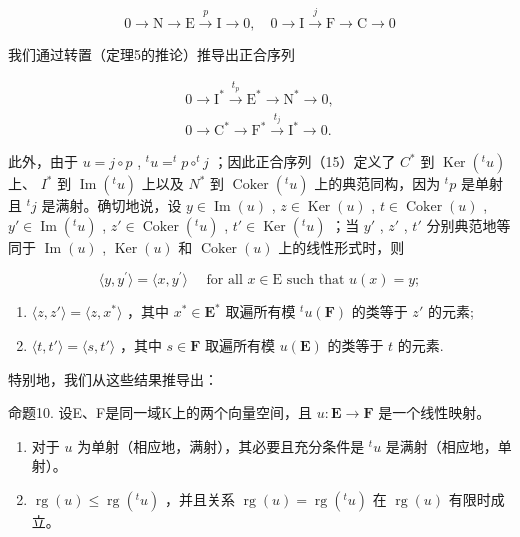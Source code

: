 \[
0 \longrightarrow \mathrm{N} \longrightarrow \mathrm{E} \stackrel {p} {\longrightarrow} \mathrm{I} \longrightarrow 0, \quad 0 \longrightarrow \mathrm{I} \stackrel {j} {\longrightarrow} \mathrm{F} \longrightarrow \mathrm{C} \longrightarrow 0 \tag {14}
\]

我们通过转置（定理5的推论）推导出正合序列

\[
\begin{array}{l} 0 \longrightarrow \mathrm{I} ^ {*} \stackrel {{t _ {p}}} {{\longrightarrow}} \mathrm{E} ^ {*} \longrightarrow \mathrm{N} ^ {*} \longrightarrow 0, \\ 0 \longrightarrow \mathrm{C} ^ {*} \longrightarrow \mathrm{F} ^ {*} \stackrel {{t _ {j}}} {{\longrightarrow}} \mathrm{I} ^ {*} \longrightarrow 0. \end{array}\tag{15}
\]

此外，由于 \(u = j \circ p\) , \(^{t}u = ^{t}p \circ ^{t}j\) ；因此正合序列（15）定义了 \(C^*\) 到 \(\operatorname{Ker}(^{t}u)\) 上、 \(I^*\) 到 \(\operatorname{Im}(^{t}u)\) 上以及 \(N^*\) 到 \(\operatorname{Coker}(^{t}u)\) 上的典范同构，因为 \(^{t}p\) 是单射且 \(^{t}j\) 是满射。确切地说，设 \(y \in \operatorname{Im}(u)\) , \(z \in \operatorname{Ker}(u)\) , \(t \in \operatorname{Coker}(u)\) , \(y' \in \operatorname{Im}(^{t}u)\) , \(z' \in \operatorname{Coker}(^{t}u)\) , \(t' \in \operatorname{Ker}(^{t}u)\) ；当 \(y'\) , \(z'\) , \(t'\) 分别典范地等同于 \(\operatorname{Im}(u)\) , \(\operatorname{Ker}(u)\) 和 \(\operatorname{Coker}(u)\) 上的线性形式时，则

\[
\langle y, y ^ {\prime} \rangle = \langle x, y ^ {\prime} \rangle \quad \text { for   all } x \in \mathrm{E} \text { such   that } u (x) = y;\tag{16}
\]

\begin{enumerate}
\def\labelenumi{(\arabic{enumi})}
\setcounter{enumi}{16}
\item
  \(\langle z, z' \rangle = \langle z, x^* \rangle\) ，其中 \(x^* \in \mathbf{E}^*\) 取遍所有模 \(^t u(\mathbf{F})\) 的类等于 \(z'\) 的元素;
\item
  \(\langle t, t' \rangle = \langle s, t' \rangle\) ，其中 \(s \in \mathbf{F}\) 取遍所有模 \(u(\mathbf{E})\) 的类等于 \(t\) 的元素.
\end{enumerate}

特别地，我们从这些结果推导出：

命题10. 设E、F是同一域K上的两个向量空间，且 \(u: \mathbf{E} \to \mathbf{F}\) 是一个线性映射。

\begin{enumerate}
\def\labelenumi{(\roman{enumi})}
\item
  对于 \(u\) 为单射（相应地，满射），其必要且充分条件是 \(^{t}u\) 是满射（相应地，单射）。
\item
  \(\operatorname{rg}(u) \leqslant \operatorname{rg}(^t u)\) ，并且关系 \(\operatorname{rg}(u) = \operatorname{rg}(^t u)\) 在 \(\operatorname{rg}(u)\) 有限时成立。
\end{enumerate}


